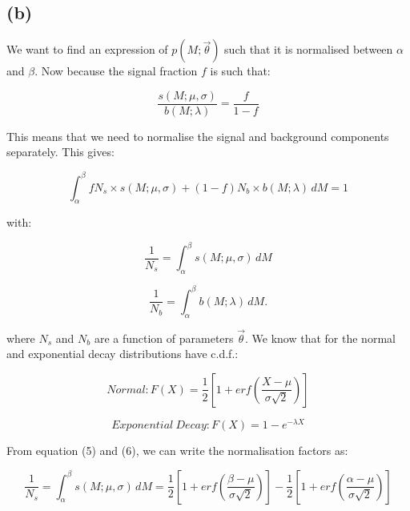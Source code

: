 \documentclass[12pt]{report} %
\begin{document}
\subsection*{(b)}
We want to find an expression of $p(M;\vec{\theta})$ such that it is normalised between $\alpha$ and $\beta$. Now because the signal fraction $f$ is such that:

\begin{equation}
    \frac{s(M;\mu,\sigma)}{b(M;\lambda)} = \frac{f}{1-f}
\end{equation}

This means that we need to normalise the signal and background components separately. This gives:

\begin{equation}
    \displaystyle \int_{\alpha}^{\beta} f N_{s} \times s(M;\mu,\sigma) + (1 - f)N_{b} \times b(M;\lambda)\, dM = 1
\end{equation}  

with:

\begin{equation}
    \frac{1}{N_{s}} = \displaystyle \int_{\alpha}^{\beta} s(M;\mu,\sigma)\, dM
\end{equation}

\begin{equation}
    \frac{1}{N_{b}} = \displaystyle \int_{\alpha}^{\beta} b(M;\lambda)\, dM.
\end{equation}

\vspace*{1\baselineskip}
where $N_{s}$ and $N_{b}$ are a function of parameters $\vec{\theta}$. We know that for the normal and exponential decay distributions have c.d.f.:  

\begin{equation}
    Normal: \displaystyle F(X) = \frac{1}{2}[1 + erf(\frac{X - \mu}{\sigma\sqrt{2}})]
\end{equation}  

\begin{equation}
    Exponential\ Decay: \displaystyle F(X) = 1 - e^{-\lambda X}
\end{equation}  

\vspace*{1\baselineskip}
From equation (5) and (6), we can write the normalisation factors as:

\begin{equation}
    \frac{1}{N_{s}} = \int_{\alpha}^{\beta} s(M;\mu,\sigma)\, dM = \frac{1}{2}[1 + erf(\frac{\beta - \mu}{\sigma\sqrt{2}})] - \frac{1}{2}[1 + erf(\frac{\alpha - \mu}{\sigma\sqrt{2}})]
\end{equation}
\end{document}
